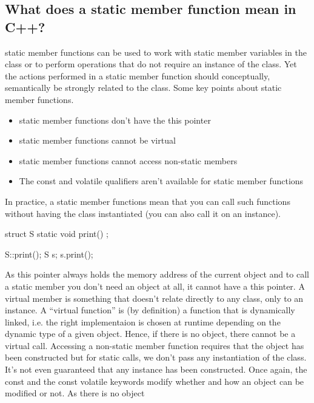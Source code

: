 \documentclass{report}
\begin{document}
\subsection{What does a static member function mean in C++?}
\bigbreak \noindent 
static member functions can be used to work with static member
variables in the class or to perform operations that do not require an
instance of the class. Yet the actions performed in a static member
function should conceptually, semantically be strongly related to
the class. Some key points about static member functions.
\begin{itemize}
    \item static member functions don’t have the this pointer
    \item static member functions cannot be virtual
    \item static member functions cannot access non-static members
    \item The const and volatile qualifiers aren’t available for static member functions
\end{itemize}
\bigbreak \noindent 
In practice, a static member functions mean that you can call
such functions without having the class instantiated (you can also call it on an instance).
\bigbreak \noindent 
\begin{cppcode}
    struct S {
        static void print() {}
    };

    S::print();
    S s;
    s.print();
\end{cppcode}
\bigbreak \noindent 
As this pointer always holds the memory address of the current object and to call a static member you don’t need an object at all, it cannot have a this pointer.
\bigbreak \noindent 
A virtual member is something that doesn’t relate directly to any class, only to an instance. A “virtual function” is (by definition) a function that is dynamically linked, i.e. the right implementaion is chosen at runtime depending on the dynamic type of a given object. Hence, if there is no object, there cannot be a virtual call.
\bigbreak \noindent 
Accessing a non-static member function requires that the object has been constructed but for static calls, we don’t pass any instantiation of the class. It’s not even guaranteed that any instance has been constructed.
\bigbreak \noindent 
Once again, the const and the const volatile keywords modify whether and how an object can be modified or not. As there is no object
\bigbreak \noindent 
\end{document}
